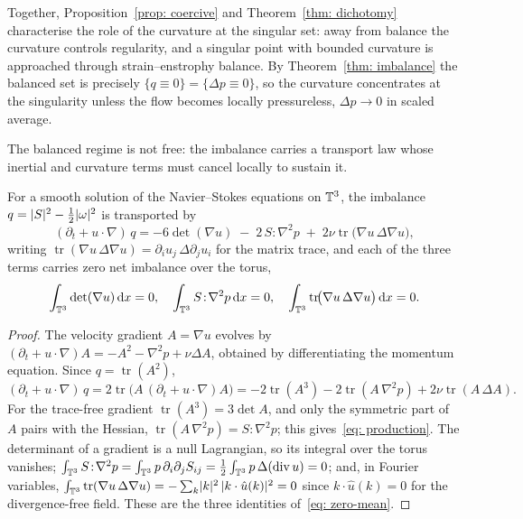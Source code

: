 Together, Proposition~\ref{prop: coercive} and Theorem~\ref{thm: dichotomy}
characterise the role of the curvature at the singular set: away from balance the
curvature controls regularity, and a singular point with bounded curvature is
approached through strain--enstrophy balance. By Theorem~\ref{thm: imbalance} the
balanced set is precisely $\{q \equiv 0\} = \{\Delta p \equiv 0\}$, so the curvature
concentrates at the singularity unless the flow becomes locally pressureless,
$\Delta p \to 0$ in scaled average.

The balanced regime is not free: the imbalance carries a transport law whose
inertial and curvature terms must cancel locally to sustain it.

\begin{proposition}\label{prop: production}
For a smooth solution of the Navier--Stokes
equations on $\mathbb{T}^3$, the imbalance $q = \lvert S \rvert^2 - \tfrac12\lvert \omega \rvert^2$ is
transported by
\begin{equation}\label{eq: production}
  (\partial_t + u\cdot\nabla)\,q
   = -6\det(\nabla u) \;-\; 2\,S\!:\!\nabla^2 p
     \;+\; 2\nu\operatorname{tr}\!\bigl(\nabla u\,\Delta\nabla u\bigr),
\end{equation}
writing $\operatorname{tr}(\nabla u\,\Delta\nabla u) = \partial_i u_j\,\Delta\partial_j u_i$
for the matrix trace, and each of the three terms carries zero net imbalance over
the torus,
\begin{equation}\label{eq: zero-mean}
  \int_{\mathbb{T}^3}\det(\nabla u)\,\mathrm{d} x = 0,
  \quad
  \int_{\mathbb{T}^3} S\!:\!\nabla^2 p \,\mathrm{d} x = 0,
  \quad
  \int_{\mathbb{T}^3} \operatorname{tr}\!\bigl(\nabla u\,\Delta\nabla u\bigr)\,\mathrm{d} x = 0.
\end{equation}
\end{proposition}

\begin{proof}
The velocity gradient $A = \nabla u$ evolves by
$(\partial_t + u\cdot\nabla)A = -A^2 - \nabla^2 p + \nu\Delta A$, obtained by
differentiating the momentum equation. Since $q = \operatorname{tr}(A^2)$,
\[
  (\partial_t + u\cdot\nabla)\,q = 2\operatorname{tr}\!\bigl(A\,(\partial_t + u\cdot\nabla)A\bigr)
  = -2\operatorname{tr}(A^3) - 2\operatorname{tr}(A\,\nabla^2 p) + 2\nu\operatorname{tr}(A\,\Delta A).
\]
For the trace-free gradient $\operatorname{tr}(A^3) = 3\det A$, and only the
symmetric part of $A$ pairs with the Hessian,
$\operatorname{tr}(A\,\nabla^2 p) = S\!:\!\nabla^2 p$; this
gives~\eqref{eq: production}. The determinant of a gradient is a null Lagrangian,
so its integral over the torus vanishes;
$\int_{\mathbb{T}^3} S\!:\!\nabla^2 p = \int_{\mathbb{T}^3} p\,\partial_i\partial_j S_{ij}
= \tfrac12\int_{\mathbb{T}^3} p\,\Delta(\operatorname{div}u) = 0$; and, in Fourier
variables, $\int_{\mathbb{T}^3}\operatorname{tr}(\nabla u\,\Delta\nabla u)
= -\sum_k \lvert k \rvert^2\,\lvert k\cdot\hat u(k) \rvert^2 = 0$ since $k\cdot\hat u(k) = 0$ for the
divergence-free field. These are the three identities of~\eqref{eq: zero-mean}.
\end{proof}

